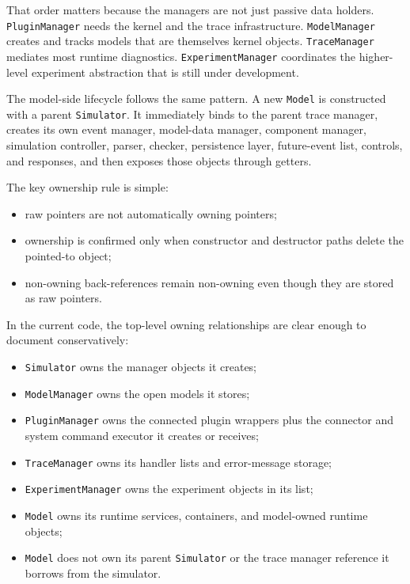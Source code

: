 That order matters because the managers are not just passive data holders.
\texttt{PluginManager} needs the kernel and the trace infrastructure.
\texttt{ModelManager} creates and tracks models that are themselves kernel
objects.
\texttt{TraceManager} mediates most runtime diagnostics.
\texttt{ExperimentManager} coordinates the higher-level experiment abstraction
that is still under development.

The model-side lifecycle follows the same pattern. A new \texttt{Model} is
constructed with a parent \texttt{Simulator}. It immediately binds to the
parent trace manager, creates its own event manager, model-data manager,
component manager, simulation controller, parser, checker, persistence layer,
future-event list, controls, and responses, and then exposes those objects
through getters.

The key ownership rule is simple:
\begin{itemize}
\item raw pointers are not automatically owning pointers;
\item ownership is confirmed only when constructor and destructor paths delete
the pointed-to object;
\item non-owning back-references remain non-owning even though they are stored
as raw pointers.
\end{itemize}

In the current code, the top-level owning relationships are clear enough to
document conservatively:
\begin{itemize}
\item \texttt{Simulator} owns the manager objects it creates;
\item \texttt{ModelManager} owns the open models it stores;
\item \texttt{PluginManager} owns the connected plugin wrappers plus the
connector and system command executor it creates or receives;
\item \texttt{TraceManager} owns its handler lists and error-message storage;
\item \texttt{ExperimentManager} owns the experiment objects in its list;
\item \texttt{Model} owns its runtime services, containers, and model-owned
runtime objects;
\item \texttt{Model} does not own its parent \texttt{Simulator} or the trace
manager reference it borrows from the simulator.
\end{itemize}

